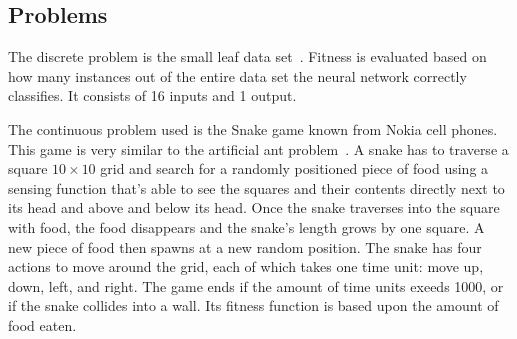 \subsection{Problems}
The discrete problem is the small leaf data set~\cite{Bache+Lichman:2013, leafdataset}. Fitness is evaluated based on how many instances out of the entire data set the neural network correctly classifies. It consists of 16 inputs and 1 output.


The continuous problem used is the Snake game known from Nokia cell phones. This game is very similar to the artificial ant problem~\cite[p.\ 147--155]{koza1992genetic}. A snake has to traverse a square $10\times10$ grid and search for a randomly positioned piece of food using a sensing function that's able to see the squares and their contents directly next to its head and above and below its head. Once the snake traverses into the square with food, the food disappears and the snake's length grows by one square. A new piece of food then spawns at a new random position. The snake has four actions to move around the grid, each of which takes one time unit: move up, down, left, and right. The game ends if the amount of time units exeeds \num{1000}, or if the snake collides into a wall. Its fitness function is based upon the amount of food eaten.
